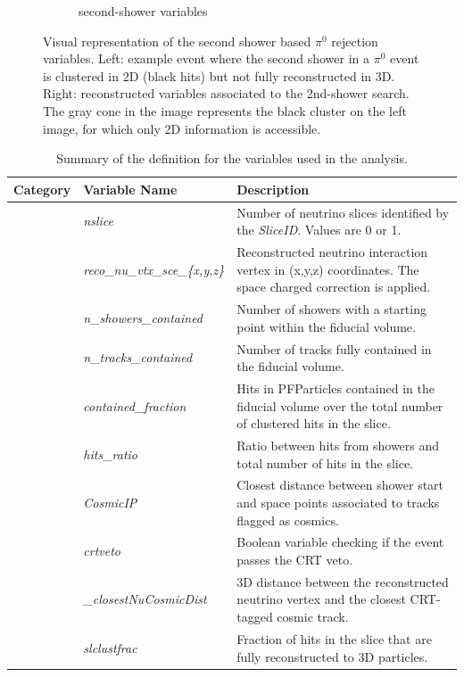 \begin{figure}[H]
\begin{center}
\begin{subfigure}[b]{0.35\textwidth}
    \caption{\label{fig:nue:variables:secondshower}second-shower variables }
    \end{subfigure}
\caption{\label{fig:nue:variables:secondshower} Visual representation of the second shower based $\pi^0$ rejection variables. Left: example event where the second shower in a $\pi^0$ event is clustered in 2D (black hits) but not fully reconstructed in 3D. Right: reconstructed variables associated to the 2nd-shower search. The gray cone in the image represents the black cluster on the left image, for which only 2D information is accessible.}
\end{center}
\end{figure}

\begin{table}[ht]
\caption{\label{tab:variableSummary} Summary of the definition for the variables used in the analysis.}
\centering
\begin{tabular}{ m{} | m{} | m{}  }
Category & Variable Name & Description  \\
\hline

\multicolumn{1}{l|}{} & \emph{nslice} &  Number of neutrino slices identified by the \emph{SliceID}. Values are  0 or 1.\\  \cline{2-3}
\multicolumn{1}{l|}{} & \emph{reco\_nu\_vtx\_sce\_\{x,y,z\}} & Reconstructed neutrino interaction vertex in (x,y,z) coordinates. The space charged correction is applied.  \\  \cline{2-3}
\multicolumn{1}{l|}{} & \emph{n\_showers\_contained} & Number of showers with a starting point within the fiducial volume. \\  \cline{2-3}
\multicolumn{1}{l|}{} & \emph{n\_tracks\_contained} & Number of tracks fully contained in the fiducial volume.  \\  \cline{2-3}
\multicolumn{1}{l|}{} & \emph{contained\_fraction} & Hits in PFParticles contained in the fiducial volume over the total number of clustered hits in the slice.  \\  \cline{2-3}
\parbox[t]{2mm}{} & \emph{hits\_ratio} & Ratio between hits from showers and total number of hits in the slice. \\  
 & \emph{CosmicIP} & Closest distance between shower start and space points associated to tracks flagged as cosmics. \\  
 & \emph{crtveto} & Boolean variable checking if the event passes the CRT veto. \\  
 & \emph{\_closestNuCosmicDist} &  3D distance between the reconstructed neutrino vertex and the closest CRT-tagged cosmic track. \\  
 & \emph{slclustfrac} & Fraction of hits in the slice that are fully reconstructed to 3D particles. \\  
\hline


\end{tabular}
\end{table}
